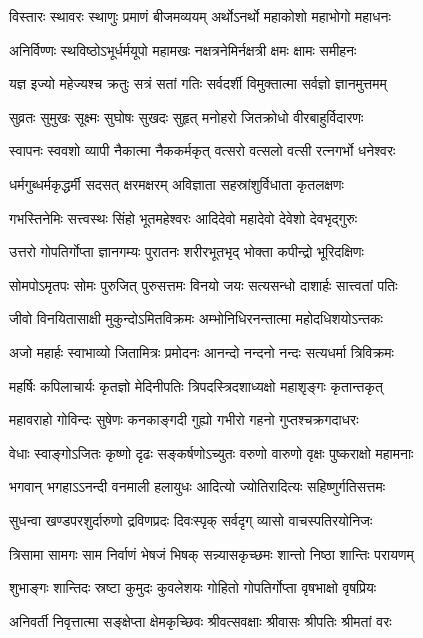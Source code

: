 \twolineshloka
{विस्तारः स्थावरः स्थाणुः प्रमाणं बीजमव्ययम्}
{अर्थोऽनर्थो महाकोशो महाभोगो महाधनः}

\twolineshloka
{अनिर्विण्णः स्थविष्ठोऽभूर्धर्मयूपो महामखः}
{नक्षत्रनेमिर्नक्षत्री क्षमः क्षामः समीहनः}

\twolineshloka
{यज्ञ इज्यो महेज्यश्च क्रतुः सत्रं सतां गतिः}
{सर्वदर्शी विमुक्तात्मा सर्वज्ञो ज्ञानमुत्तमम्}

\twolineshloka
{सुव्रतः सुमुखः सूक्ष्मः सुघोषः सुखदः सुहृत्}
{मनोहरो जितक्रोधो वीरबाहुर्विदारणः}

\twolineshloka
{स्वापनः स्ववशो व्यापी नैकात्मा नैककर्मकृत्}
{वत्सरो वत्सलो वत्सी रत्नगर्भो धनेश्वरः}

\twolineshloka
{धर्मगुब्धर्मकृद्धर्मी सदसत् क्षरमक्षरम्}
{अविज्ञाता सहस्रांशुर्विधाता कृतलक्षणः}

\twolineshloka
{गभस्तिनेमिः सत्त्वस्थः सिंहो भूतमहेश्वरः}
{आदिदेवो महादेवो देवेशो देवभृद्गुरुः}

\twolineshloka
{उत्तरो गोपतिर्गोप्ता ज्ञानगम्यः पुरातनः}
{शरीरभूतभृद् भोक्ता कपीन्द्रो भूरिदक्षिणः}

\twolineshloka
{सोमपोऽमृतपः सोमः पुरुजित् पुरुसत्तमः}
{विनयो जयः सत्यसन्धो दाशार्हः सात्त्वतां पतिः}

\twolineshloka
{जीवो विनयितासाक्षी मुकुन्दोऽमितविक्रमः}
{अम्भोनिधिरनन्तात्मा महोदधिशयोऽन्तकः}

\twolineshloka
{अजो महार्हः स्वाभाव्यो जितामित्रः प्रमोदनः}
{आनन्दो नन्दनो नन्दः सत्यधर्मा त्रिविक्रमः}

\twolineshloka
{महर्षिः कपिलाचार्यः कृतज्ञो मेदिनीपतिः}
{त्रिपदस्त्रिदशाध्यक्षो महाशृङ्गः कृतान्तकृत्}

\twolineshloka
{महावराहो गोविन्दः सुषेणः कनकाङ्गदी}
{गुह्यो गभीरो गहनो गुप्तश्चक्रगदाधरः}

\twolineshloka
{वेधाः स्वाङ्गोऽजितः कृष्णो दृढः सङ्कर्षणोऽच्युतः}
{वरुणो वारुणो वृक्षः पुष्कराक्षो महामनाः}

\twolineshloka
{भगवान् भगहाऽऽनन्दी वनमाली हलायुधः}
{आदित्यो ज्योतिरादित्यः सहिष्णुर्गतिसत्तमः}

\twolineshloka
{सुधन्वा खण्डपरशुर्दारुणो द्रविणप्रदः}
{दिवःस्पृक् सर्वदृग् व्यासो वाचस्पतिरयोनिजः}

\twolineshloka
{त्रिसामा सामगः साम निर्वाणं भेषजं भिषक्}
{सन्न्यासकृच्छमः शान्तो निष्ठा शान्तिः परायणम्}

\twolineshloka
{शुभाङ्गः शान्तिदः स्रष्टा कुमुदः कुवलेशयः}
{गोहितो गोपतिर्गोप्ता वृषभाक्षो वृषप्रियः}

\twolineshloka
{अनिवर्ती निवृत्तात्मा सङ्क्षेप्ता क्षेमकृच्छिवः}
{श्रीवत्सवक्षाः श्रीवासः श्रीपतिः श्रीमतां वरः}

